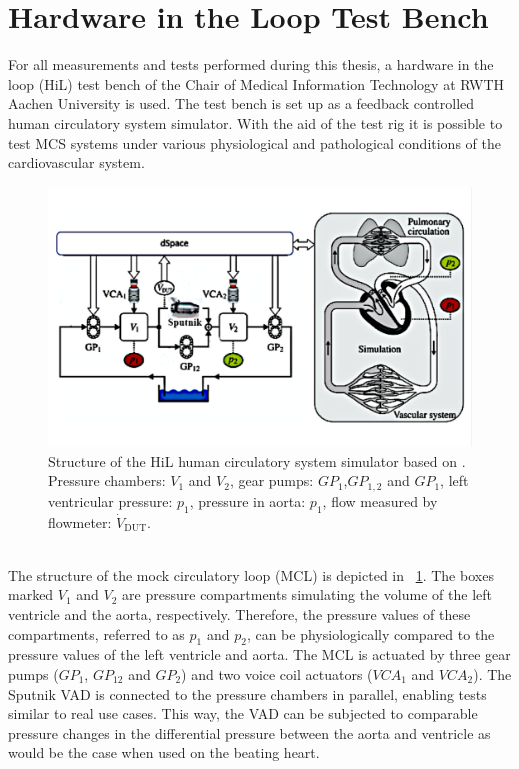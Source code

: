 \section{Hardware in the Loop Test Bench}
For all measurements and tests performed during this thesis, a hardware in the loop (HiL) test bench of the Chair of Medical Information Technology at RWTH Aachen University is used. The test bench is set up as a feedback controlled human circulatory system simulator. With the aid of the test rig it is possible to test MCS systems under various physiological and pathological conditions of the cardiovascular system.
\begin{figure}[ht]
  \centering
  \includegraphics[width=\textwidth]{images/chapt_4/mock_loop_1.pdf}
  \caption[HiL test bench]{Structure of the HiL human circulatory system simulator based on \cite{MCL}. Pressure chambers: $V_{\mathrm{1}}$ and $V_{\mathrm{2}}$, gear pumps: $GP_{\mathrm{1}}$,$GP_{\mathrm{1,2}}$ and $GP_{\mathrm{1}}$, left ventricular pressure: $p_{\mathrm{1}}$, pressure in aorta: $p_{\mathrm{1}}$, flow measured by flowmeter: $\dot{V}_{\mathrm{DUT}}$.}
  \label{fig:mock_loop}
\end{figure}
\\The structure of the mock circulatory loop (MCL) is depicted in \figurename~\ref{fig:mock_loop}. The boxes marked $V_{\mathrm{1}}$ and $V_{\mathrm{2}}$ are pressure compartments simulating the volume of the left ventricle and the aorta, respectively. Therefore, the pressure values of these compartments, referred to as $p_{\mathrm{1}}$ and $p_{\mathrm{2}}$, can be physiologically compared to the pressure values of the left ventricle and aorta. The MCL is actuated by three gear pumps ($GP_{\mathrm{1}}$, $GP_{\mathrm{12}}$ and $GP_{\mathrm{2}}$) and two voice coil actuators ($VCA_{\mathrm{1}}$ and $VCA_{\mathrm{2}}$). The Sputnik VAD is connected to the pressure chambers in parallel, enabling tests similar to real use cases. This way, the VAD can be subjected to comparable pressure changes in the differential pressure between the aorta and ventricle as would be the case when used on the beating heart.
